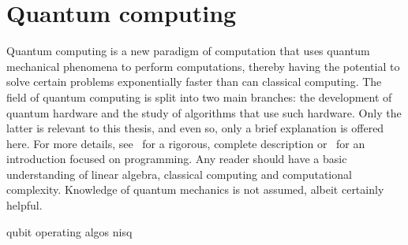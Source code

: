 \chapter{Quantum computing}
\label{chap:qc}
Quantum computing is a new paradigm of computation that uses quantum mechanical phenomena to perform computations, thereby having the potential to solve certain problems exponentially faster than can classical computing.
The field of quantum computing is split into two main branches: the development of quantum hardware and the study of algorithms that use such hardware.
Only the latter is relevant to this thesis, and even so, only a brief explanation is offered here.
For more details, see~\autocite{nielsen2012} for a rigorous, complete description or~\autocite{qiskit_textbook} for an introduction focused on programming.
Any reader should have a basic understanding of linear algebra, classical computing and computational complexity.
Knowledge of quantum mechanics is not assumed, albeit certainly helpful.

{qubit}
{operating}
{algos}
{nisq}





